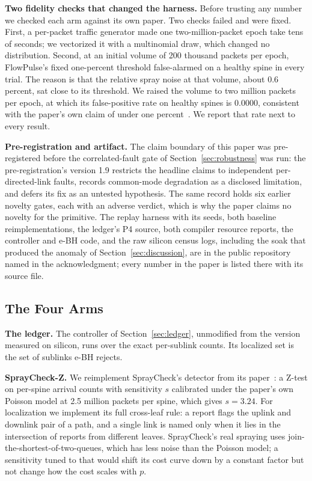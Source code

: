 \textbf{Two fidelity checks that changed the harness.} Before trusting any number we checked each arm against its own paper. Two checks failed and were fixed. First, a per-packet traffic generator made one two-million-packet epoch take tens of seconds; we vectorized it with a multinomial draw, which changed no distribution. Second, at an initial volume of 200 thousand packets per epoch, FlowPulse's fixed one-percent threshold false-alarmed on a healthy spine in every trial. The reason is that the relative spray noise at that volume, about 0.6 percent, sat close to its threshold. We raised the volume to two million packets per epoch, at which its false-positive rate on healthy spines is 0.0000, consistent with the paper's own claim of under one percent~\cite{flowpulse}. We report that rate next to every result.

\textbf{Pre-registration and artifact.} The claim boundary of this paper was pre-registered before the correlated-fault gate of Section~\ref{sec:robustness} was run: the pre-registration's version 1.9 restricts the headline claims to independent per-directed-link faults, records common-mode degradation as a disclosed limitation, and defers its fix as an untested hypothesis. The same record holds six earlier novelty gates, each with an adverse verdict, which is why the paper claims no novelty for the primitive. The replay harness with its seeds, both baseline reimplementations, the ledger's P4 source, both compiler resource reports, the controller and e-BH code, and the raw silicon census logs, including the soak that produced the anomaly of Section~\ref{sec:discussion}, are in the public repository named in the acknowledgment; every number in the paper is listed there with its source file.

\subsection{The Four Arms}

\textbf{The ledger.} The controller of Section~\ref{sec:ledger}, unmodified from the version measured on silicon, runs over the exact per-sublink counts. Its localized set is the set of sublinks e-BH rejects.

\textbf{SprayCheck-Z.} We reimplement SprayCheck's detector from its paper~\cite{spraycheck}: a Z-test on per-spine arrival counts with sensitivity $s$ calibrated under the paper's own Poisson model at 2.5 million packets per spine, which gives $s=3.24$. For localization we implement its full cross-leaf rule: a report flags the uplink and downlink pair of a path, and a single link is named only when it lies in the intersection of reports from different leaves. SprayCheck's real spraying uses join-the-shortest-of-two-queues, which has less noise than the Poisson model; a sensitivity tuned to that would shift its cost curve down by a constant factor but not change how the cost scales with $p$.

